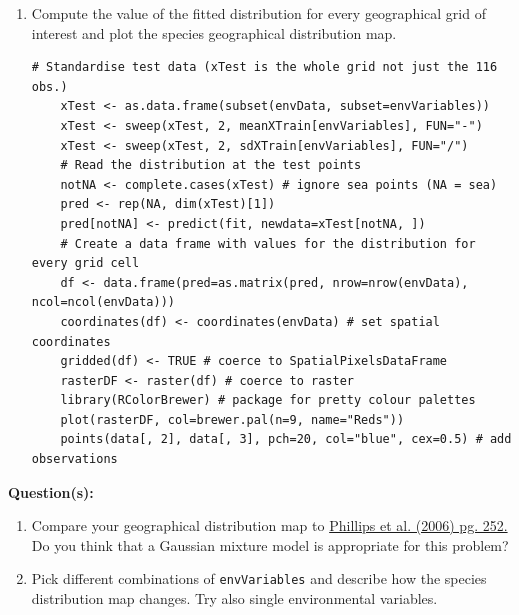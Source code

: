 \documentclass[a4paper,11pt]{article}
\begin{document}
\begin{enumerate}
	\item Compute the value of the fitted distribution for every geographical grid of interest and plot the species geographical distribution map.
	\vspace{0.3cm}
	\begin{lstlisting}[style=RCode]
	# Standardise test data (xTest is the whole grid not just the 116 obs.)
	xTest <- as.data.frame(subset(envData, subset=envVariables)) 
	xTest <- sweep(xTest, 2, meanXTrain[envVariables], FUN="-")
	xTest <- sweep(xTest, 2, sdXTrain[envVariables], FUN="/")
	# Read the distribution at the test points
	notNA <- complete.cases(xTest) # ignore sea points (NA = sea) 
	pred <- rep(NA, dim(xTest)[1])
	pred[notNA] <- predict(fit, newdata=xTest[notNA, ])
	# Create a data frame with values for the distribution for every grid cell
	df <- data.frame(pred=as.matrix(pred, nrow=nrow(envData), ncol=ncol(envData)))
	coordinates(df) <- coordinates(envData) # set spatial coordinates
	gridded(df) <- TRUE # coerce to SpatialPixelsDataFrame
	rasterDF <- raster(df) # coerce to raster
	library(RColorBrewer) # package for pretty colour palettes
	plot(rasterDF, col=brewer.pal(n=9, name="Reds"))
	points(data[, 2], data[, 3], pch=20, col="blue", cex=0.5) # add observations
	\end{lstlisting}
	\vspace{-0.6cm}

\end{enumerate}

\begin{framed}
\textbf{Question(s):}
\begin{enumerate}
	\item Compare your geographical distribution map to \href{http://www.cs.princeton.edu/~schapire/papers/ecolmod.pdf}{Phillips et al. (2006) pg. 252.} 
	Do you think that a Gaussian mixture model is appropriate for this problem?
	\item Pick different combinations of \texttt{envVariables} and describe how the species distribution map changes. Try also single environmental variables.
\end{enumerate}
\end{framed}

\clearpage

\end{document}
